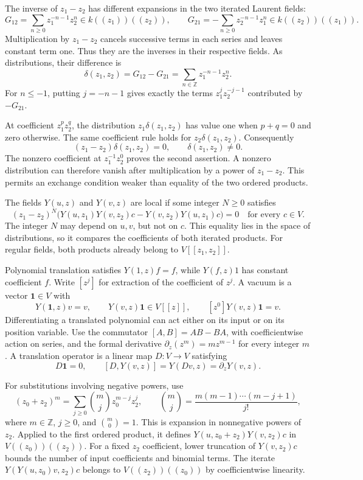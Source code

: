The inverse of $z_1-z_2$ has different expansions in the two
iterated Laurent fields:
\[
 G_{12}=\sum_{n\geq0}z_1^{-n-1}z_2^n
       \in k((z_1))((z_2)),\qquad
 G_{21}=-\sum_{n\geq0}z_2^{-n-1}z_1^n
       \in k((z_2))((z_1)).
\]
Multiplication by $z_1-z_2$ cancels successive terms in each
series and leaves constant term one.
Thus they are the inverses in their respective fields.
As distributions, their difference is
\[
 \delta(z_1,z_2)=G_{12}-G_{21}
      =\sum_{n\in\mathbb Z}z_1^{-n-1}z_2^n.
\]
For $n\leq-1$, putting $j=-n-1$ gives exactly the terms
$z_1^jz_2^{-j-1}$ contributed by $-G_{21}$.

At coefficient $z_1^p z_2^q$, the distribution
$z_1\delta(z_1,z_2)$ has value one when $p+q=0$ and zero otherwise.
The same coefficient rule holds for $z_2\delta(z_1,z_2)$.
Consequently
\[
 (z_1-z_2)\delta(z_1,z_2)=0,
 \qquad \delta(z_1,z_2)\ne0.
\]
The nonzero coefficient at $z_1^{-1}z_2^0$ proves the second assertion.
A nonzero distribution can therefore vanish after multiplication by
a power of $z_1-z_2$.
This permits an exchange condition weaker than equality of the two
ordered products.

The fields $Y(u,z)$ and $Y(v,z)$ are local if some integer
$N\geq0$ satisfies
\begin{equation}\label{eq:vertex-ordinary-locality}
 (z_1-z_2)^N\bigl(Y(u,z_1)Y(v,z_2)c
                  -Y(v,z_2)Y(u,z_1)c\bigr)=0
 \quad\text{for every }c\in V.
\end{equation}
The integer $N$ may depend on $u,v$, but not on $c$.
This equality lies in the space of distributions, so it compares
the coefficients of both iterated products.
For regular fields, both products already belong to $V[[z_1,z_2]]$.

Polynomial translation satisfies $Y(1,z)f=f$, while $Y(f,z)1$ has
constant coefficient $f$.
Write $[z^j]$ for extraction of the coefficient of $z^j$.
A vacuum is a vector $\mathbf1\in V$ with
\[
 Y(\mathbf1,z)v=v,\qquad
 Y(v,z)\mathbf1\in V[[z]],\qquad
 [z^0]Y(v,z)\mathbf1=v.
\]
Differentiating a translated polynomial can act either on its input
or on its position variable.
Use the commutator $[A,B]=AB-BA$, with coefficientwise action on
series, and the formal derivative $\partial_z(z^m)=mz^{m-1}$ for
every integer $m$.
A translation operator is a linear map $D:V\to V$ satisfying
\[
 D\mathbf1=0,\qquad
 [D,Y(v,z)]=Y(Dv,z)=\partial_zY(v,z).
\]

For substitutions involving negative powers, use
\[
 (z_0+z_2)^m
   =\sum_{j\geq0}\binom mj z_0^{m-j}z_2^j,
 \qquad
 \binom mj=\frac{m(m-1)\cdots(m-j+1)}{j!},
\]
where $m\in\mathbb Z$, $j\geq0$, and $\binom m0=1$.
This is expansion in nonnegative powers of $z_2$.
Applied to the first ordered product, it defines
$Y(u,z_0+z_2)Y(v,z_2)c$ in $V((z_0))((z_2))$.
For a fixed $z_2$ coefficient, lower truncation of $Y(v,z_2)c$
bounds the number of input coefficients and binomial terms.
The iterate $Y(Y(u,z_0)v,z_2)c$ belongs to
$V((z_2))((z_0))$ by coefficientwise linearity.

